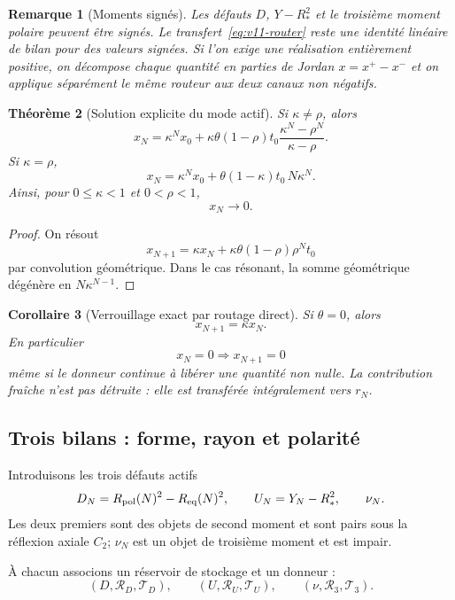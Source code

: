 \documentclass[11pt,a4paper]{article}
\newtheorem{theorem}{Théorème}[section]
\newtheorem{corollary}[theorem]{Corollaire}
\newtheorem{remark}[theorem]{Remarque}
\begin{document}
\begin{remark}[Moments signés]
Les défauts $D$, $Y-R_*^2$ et le troisième moment polaire peuvent être signés. Le transfert~\eqref{eq:v11-router} reste une identité linéaire de bilan pour des valeurs signées. Si l'on exige une réalisation entièrement positive, on décompose chaque quantité en parties de Jordan $x=x^+-x^-$ et on applique séparément le même routeur aux deux canaux non négatifs.
\end{remark}

\begin{theorem}[Solution explicite du mode actif]\label{thm:v11-active-solution}
Si $\kappa\ne\rho$, alors
\[
 \boxed{
 x_N
 =
 \kappa^N x_0
 +
 \kappa\theta(1-\rho)t_0
 \frac{\kappa^N-\rho^N}{\kappa-\rho}.}
\]
Si $\kappa=\rho$,
\[
 x_N
 =
 \kappa^N x_0+
 \theta(1-\kappa)t_0\,N\kappa^N.
\]
Ainsi, pour $0\le\kappa<1$ et $0<\rho<1$,
\[
 \boxed{x_N\longrightarrow0.}
\]
\end{theorem}

\begin{proof}
On résout
\[
 x_{N+1}=\kappa x_N+\kappa\theta(1-\rho)\rho^Nt_0
\]
par convolution géométrique. Dans le cas résonant, la somme géométrique dégénère en $N\kappa^{N-1}$.
\end{proof}

\begin{corollary}[Verrouillage exact par routage direct]\label{cor:v11-exact-routing}
Si $\theta=0$, alors
\[
 x_{N+1}=\kappa x_N.
\]
En particulier
\[
 x_N=0\Longrightarrow x_{N+1}=0
\]
même si le donneur continue à libérer une quantité non nulle. La contribution fraîche n'est pas détruite : elle est transférée intégralement vers $r_N$.
\end{corollary}

\subsection{Trois bilans : forme, rayon et polarité}

Introduisons les trois défauts actifs
\[
 D_N=R_{\rm pol}(N)^2-R_{\rm eq}(N)^2,\qquad
 U_N=Y_N-R_*^2,\qquad
 \nu_N.
\]
Les deux premiers sont des objets de second moment et sont pairs sous la réflexion axiale $C_2$; $\nu_N$ est un objet de troisième moment et est impair.

À chacun associons un réservoir de stockage et un donneur :
\[
 (D,\mathscr R_D,\mathscr T_D),\qquad
 (U,\mathscr R_U,\mathscr T_U),\qquad
 (\nu,\mathscr R_3,\mathscr T_3).
\]
\end{document}

